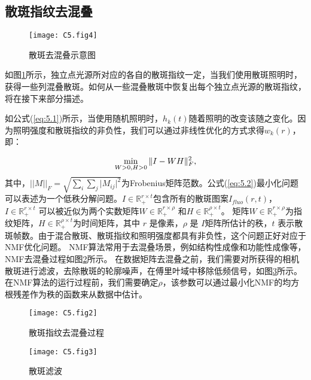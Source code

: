 \subsection{散斑指纹去混叠}

\begin{figure}[htp]
	\centering
	\texttt{[image: C5.fig4]}
	\caption{散斑去混叠示意图}
	\label{fig:5.4}
\end{figure}

如图\ref{fig:5.4}所示，独立点光源所对应的各自的散斑指纹一定，当我们使用散斑照明时，获得一些列混叠散斑。如何从一些混叠散斑中恢复出每个独立点光源的散斑指纹，将在接下来部分描述。

如公式(\ref{eq:5.1})所示，当使用随机照明时，$h_{k}(t)$随着照明的改变该随之变化。因为照明强度和散斑指纹的非负性，我们可以通过非线性优化的方式求得$w_{k}(r)$，即：

\begin{equation}
	\begin{aligned}
\min_{W>0,H>0} \Arrowvert I -WH\Arrowvert_F^{2},
\label{eq:5.2}
\end{aligned}
\end{equation}
其中，$\vert\vert M\vert\vert_F = \sqrt{\sum_i\sum_j \vert M_{ij}\vert^2}$为Frobenius矩阵范数。公式(\ref{eq:5.2})最小化问题可以表述为一个低秩分解问题。$I \in \mathbb{R}_{+}^{r \times t} $包含所有的散斑图案$I_{fluo}(r,t)$，$I \in \mathbb{R}_{+}^{r \times t}$ 可以被近似为两个实数矩阵$W \in \mathbb{R}_{+}^{r \times \rho}$ 和$H \in \mathbb{R}_{+}^{\rho \times t}$。
矩阵$W \in \mathbb{R}_{+}^{r \times \rho}$为指纹矩阵，$H \in \mathbb{R}_{+}^{\rho \times t}$为时间矩阵，其中 $r$ 是像素，$\rho$ 是 $I$矩阵所估计的秩，$t$ 表示散斑帧数。由于混合散斑、散斑指纹和照明强度都具有非负性，这个问题正好对应于NMF优化问题。
NMF算法常用于去混叠场景，例如结构性成像\cite{boniface_non_invasive_2020}和功能性成像\cite{Moretti2020a,Pegard2016, Pnevmatikakis2016}等，NMF去混叠过程如图\ref{fig:5.2}所示。
在数据矩阵去混叠之前，我们需要对所获得的相机散斑进行滤波，去除散斑的轮廓噪声，在傅里叶域中移除低频信号，如图\ref{fig:5.3}所示。在NMF算法的运行过程前，我们需要确定$\rho$，该参数可以通过最小化NMF的均方根残差作为秩的函数来从数据中估计。

\begin{figure}[htp]
	\centering
	\texttt{[image: C5.fig2]}
	\caption{散斑指纹去混叠过程}
	\label{fig:5.2}
\end{figure}

\begin{figure}[htp]
	\centering
	\texttt{[image: C5.fig3]}
	\caption{散斑滤波}
	\label{fig:5.3}
\end{figure}

